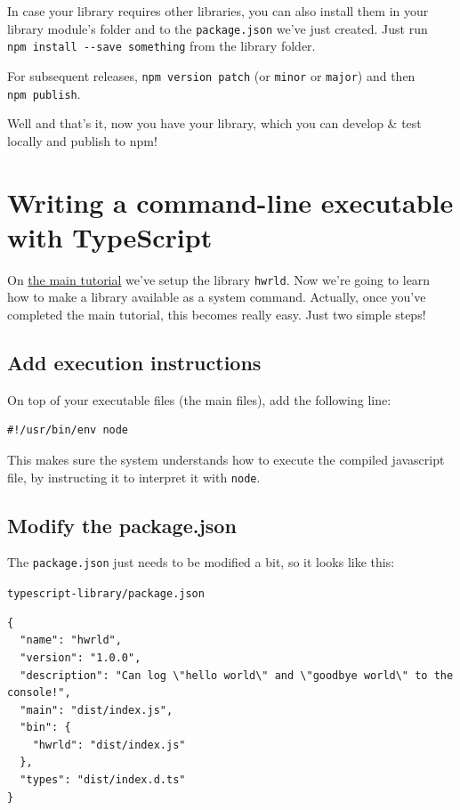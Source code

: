 \documentclass[12pt,a4paper]{article}
\newcommand{\filelabel}[1]{{\footnotesize\color{dkgreen}\texttt{#1}}{\vspace{-0.2cm}}}
\begin{document}
In case your library requires other libraries, you can also install them
in your library module's folder and to the \texttt{package.json} we've
just created. Just run \texttt{npm\ install\ -\/-save\ something} from
the library folder.

For subsequent releases, \texttt{npm\ version\ patch} (or \texttt{minor}
or \texttt{major}) and then \texttt{npm\ publish}.

Well and that's it, now you have your library, which you can develop \&
test locally and publish to npm!


\section{Writing a command-line executable with
TypeScript}\label{writing-a-command-line-executable-with-typescript}

On \href{/}{the main tutorial} we've setup the library
\texttt{\textquotesingle{}hwrld\textquotesingle{}}. Now we're going to
learn how to make a library available as a system command. Actually,
once you've completed the main tutorial, this becomes really easy. Just
two simple steps!

\subsection{\texorpdfstring{ Add execution
instructions}{Add execution instructions}}\label{-add-execution-instructions}

On top of your executable files (the main files), add the following
line:

\begin{lstlisting}
#!/usr/bin/env node
\end{lstlisting}

This makes sure the system understands how to execute the compiled
javascript file, by instructing it to interpret it with \texttt{node}.

\subsection{\texorpdfstring{ Modify the
package.json}{Modify the package.json}}\label{step-2-modify-the-package.json}

The \texttt{package.json} just needs to be modified a bit, so it looks
like this:

\filelabel{typescript-library/package.json}

\begin{lstlisting}
{
  "name": "hwrld",
  "version": "1.0.0",
  "description": "Can log \"hello world\" and \"goodbye world\" to the console!",
  "main": "dist/index.js",
  "bin": {
    "hwrld": "dist/index.js"
  },
  "types": "dist/index.d.ts"
}
\end{lstlisting}
\end{document}
